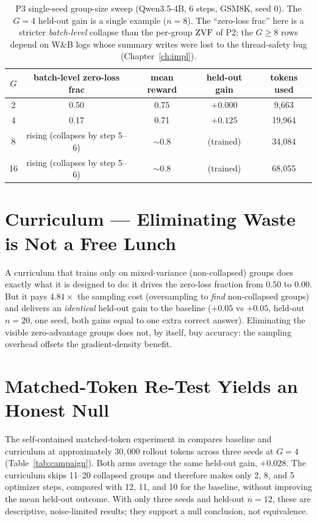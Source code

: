 \begin{table}[t]
\centering
\small
\begin{tabular}{@{}ccccc@{}}
\toprule
$G$ & batch-level zero-loss frac & mean reward & held-out gain & tokens used \\
\midrule
2  & 0.50 & 0.75 & $+0.000$ & 9{,}663 \\
4  & 0.17 & 0.71 & $+0.125$ & 19{,}964 \\
8  & rising (collapses by step 5--6) & ${\sim}0.8$ & (trained) & 34{,}084 \\
16 & rising (collapses by step 5--6) & ${\sim}0.8$ & (trained) & 68{,}055 \\
\bottomrule
\end{tabular}
\caption{P3 single-seed group-size sweep (Qwen3.5-4B, 6 steps, GSM8K, seed 0). The
$G{=}4$ held-out gain is a single example ($n=8$). The ``zero-loss frac'' here is a
stricter \emph{batch-level} collapse than the per-group $\mathrm{ZVF}$ of P2; the $G\ge8$
rows depend on W\&B logs whose summary writes were lost to the thread-safety bug
(Chapter~\ref{ch:impl}).}
\label{tab:p3}
\end{table}

\section{Curriculum --- Eliminating Waste is Not a Free Lunch}
A curriculum that trains only on mixed-variance (non-collapsed) groups does exactly
what it is designed to do: it drives the zero-loss fraction from $0.50$ to $0.00$.
But it pays $4.81\times$ the sampling cost (oversampling to \emph{find} non-collapsed
groups) and delivers an \emph{identical} held-out gain to the baseline ($+0.05$ vs
$+0.05$, held-out $n=20$, one seed, both gains equal to one extra correct answer).
Eliminating the visible zero-advantage groups does not, by itself, buy accuracy: the
sampling overhead offsets the gradient-density benefit.

\section{Matched-Token Re-Test Yields an Honest Null}
\label{sec:campaign}
The self-contained matched-token experiment in
 compares baseline and
curriculum at approximately $30{,}000$ rollout tokens across three seeds at $G{=}4$
(Table~\ref{tab:campaign}). Both arms average the same held-out gain, $+0.028$.
The curriculum skips 11--20 collapsed groups and therefore makes only 2, 8, and 5
optimizer steps, compared with 12, 11, and 10 for the baseline, without improving
the mean held-out outcome. With only three seeds and held-out $n=12$, these are
descriptive, noise-limited results; they support a null conclusion, not equivalence.

